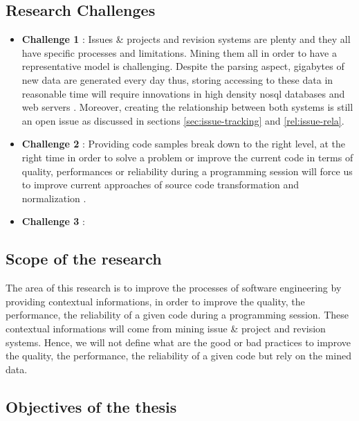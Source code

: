 \subsection{Research Challenges\label{sec:challenges}}

\begin{itemize}
	\item {\bf Challenge 1} : Issues \& projects and revision systems are plenty and they all have specific processes and limitations. Mining them all in order to have a representative model is challenging. Despite the parsing aspect, gigabytes of new data are generated every day thus, storing accessing to these data in reasonable time will require innovations in high density nosql databases \cite{Nayrolles2014b} and web servers \cite{Nayrolles2013b,Nayrolles2014c}. Moreover, creating the relationship between both systems is still an open issue as discussed in sections \ref{sec:issue-tracking} and \ref{rel:issue-rela}.

	\item {\bf Challenge 2} : Providing code samples break down to the right level, at the right time in order to solve a problem  or improve the current code in terms of quality, performances or reliability during a programming session will force us to improve current approaches of source code transformation and normalization \cite{Cordy2006a, Cordy2006,Roy2008,Cordy2011}.
	\item {\bf Challenge 3} :
\end{itemize}

\subsection{Scope of the research \label{sec:scope}}

The area of this research is to improve the processes of software engineering by providing contextual informations, in order to improve the quality, the performance, the reliability of a given code during a programming session. These contextual informations will come from mining issue \& project and revision systems. Hence, we will not define what are the good or bad practices to improve the quality, the performance, the reliability of a given code but rely on the mined data.

\subsection{Objectives of the thesis\label{sec:objective-thesis}}

